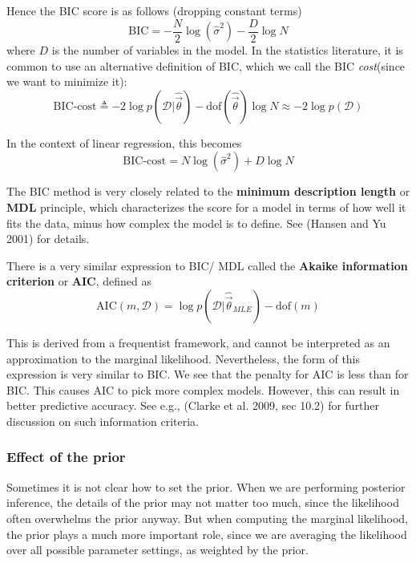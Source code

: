 Hence the BIC score is as follows (dropping constant terms)
\begin{equation}
\mathrm{BIC}=-\dfrac{N}{2}\log(\hat{\sigma}^2)-\dfrac{D}{2}\log{N}
\end{equation}
where $D$ is the number of variables in the model. In the statistics literature, it is common to use an alternative definition of BIC, which we call the BIC \emph{cost}(since we want to minimize it):
\begin{equation}
\mathrm{BIC\text{-}cost} \triangleq -2\log p(\mathcal{D}|\hat{\vec{\theta}})-\mathrm{dof}(\hat{\vec{\theta}})\log{N} \approx -2\log{p(\mathcal{D})}
\end{equation}

In the context of linear regression, this becomes
\begin{equation}
\mathrm{BIC\text{-}cost} = N\log(\hat{\sigma}^2)+D\log{N}
\end{equation}

The BIC method is very closely related to the \textbf{minimum description length} or \textbf{MDL} principle, which characterizes the score for a model in terms of how well it fits the data, minus how complex the model is to define. See (Hansen and Yu 2001) for details.

There is a very similar expression to BIC/ MDL called the \textbf{Akaike information criterion} or \textbf{AIC}, defined as
\begin{equation}
\mathrm{AIC}(m,\mathcal{D}) = \log{p(\mathcal{D}|\hat{\vec{\theta}}_{MLE})}-\mathrm{dof}(m)
\end{equation}

This is derived from a frequentist framework, and cannot be interpreted as an approximation to the marginal likelihood. Nevertheless, the form of this expression is very similar to BIC. We see that the penalty for AIC is less than for BIC. This causes AIC to pick more complex models. However, this can result in better predictive accuracy. See e.g., (Clarke et al. 2009, sec 10.2) for further discussion on such information criteria.

\subsubsection{Effect of the prior}
Sometimes it is not clear how to set the prior. When we are performing posterior inference, the details of the prior may not matter too much, since the likelihood often overwhelms the prior anyway. But when computing the marginal likelihood, the prior plays a much more important role, since we are averaging the likelihood over all possible parameter settings, as weighted by the prior.

